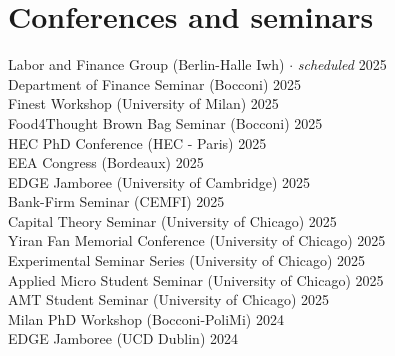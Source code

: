 \documentclass[A4,11pt]{article}
\begin{document}
\section{Conferences and seminars}
\hspace{12pt} Labor and Finance Group (Berlin-Halle Iwh) \hspace{0.3em} $\cdot$ \hspace{0.3em} \textit{scheduled} \hfill 2025\\
\smallskip
\hspace{12pt} Department of Finance Seminar (Bocconi) \hfill 2025\\
\smallskip
\hspace{12pt} Finest Workshop (University of Milan)  \hfill 2025\\
\smallskip
\hspace{12pt} Food4Thought Brown Bag Seminar (Bocconi) \hfill 2025\\
\smallskip
\hspace{12pt} HEC PhD Conference (HEC - Paris) \hfill 2025\\
\smallskip
\hspace{12pt} EEA Congress (Bordeaux) \hfill 2025\\
\smallskip
\hspace{12pt} EDGE Jamboree (University of Cambridge) \hfill 2025\\
\smallskip
\hspace{12pt} Bank-Firm Seminar (CEMFI) \hfill 2025\\
\smallskip
\hspace{12pt} Capital Theory Seminar (University of Chicago) \hfill 2025\\
\smallskip
\hspace{12pt} Yiran Fan Memorial Conference (University of Chicago) \hfill 2025\\
\smallskip
\hspace{12pt} Experimental Seminar Series (University of Chicago) \hfill 2025\\
\smallskip
\hspace{12pt} Applied Micro Student Seminar (University of Chicago) \hfill 2025\\
\smallskip
\hspace{12pt} AMT Student Seminar (University of Chicago) \hfill 2025\\
\smallskip
\hspace{12pt} Milan PhD Workshop (Bocconi-PoliMi) \hfill 2024\\
\smallskip
\hspace{12pt} EDGE Jamboree (UCD Dublin) \hfill 2024\\
\end{document}
